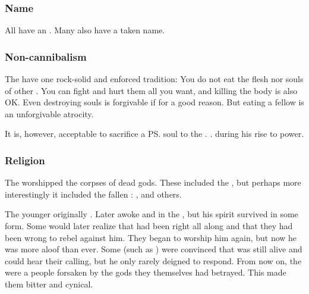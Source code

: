 \subsubsection{Name}
All \dragons{} have an . 
Many also have a taken name. 





\subsubsection{Non-cannibalism}
The \dragons{} have one rock-solid and enforced tradition: 
You do not eat the flesh nor souls of other \dragons. 
You can fight and hurt them all you want, and killing the body is also OK. 
Even destroying souls is forgivable if for a good reason. 
But eating a fellow \dragon{} is an unforgivable atrocity. 

It is, however, acceptable to sacrifice a \ps{\dragon} soul to the \xss. 
\TyarithXserasshana{} . 
\IrocasSecherdamon{}  during his rise to power. 









\subsubsection{Religion}
The \dragons{} worshipped the corpses of dead gods. 
These included the , but perhaps more interestingly it included the fallen \firstgendragons: 
\Sethicus, \Xserasshana and others. 

The younger \dragons originally . 
Later \Sethicus awoke and  in the \firstbanewar, but his spirit survived in some form. 
Some \dragons would later realize that \Sethicus had been right all along and that they had been wrong to rebel against him. 
They began to worship him again, but now he was more aloof than ever. 
Some \dragons (such as \Ishnaruchaefir) were convinced that \Sethicus was still alive and could hear their calling, but he only rarely deigned to respond. 
From now on, the \dragons were a people forsaken by the gods they themselves had betrayed.
This made them bitter and cynical. 

